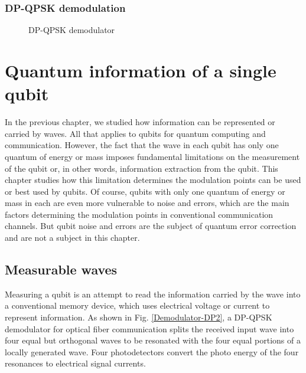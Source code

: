 \documentclass[oneside, letter, 12pt]{book}
\begin{document}
\subsection{DP-QPSK demodulation}
\begin{figure}\label{Demodulator-DP-QPSK}
    \caption{DP-QPSK demodulator}
\end{figure}

\chapter{Quantum information of a single qubit}\label{c-qinfo}
In the previous chapter, we studied how information can be represented or carried by waves. All that applies to qubits for quantum computing and communication. However, the fact that the wave in each qubit has only one quantum of energy or mass imposes fundamental limitations on the measurement of the qubit or, in other words, information extraction from the qubit. This chapter studies how this limitation determines the modulation points can be used or best used by qubits. Of course, qubits with only one quantum of energy or mass in each are even more vulnerable to noise and errors, which are the main factors determining the modulation points in conventional communication channels. But qubit noise and errors are the subject of quantum error correction and are not a subject in this chapter.

\section{Measurable waves}
Measuring a qubit is an attempt to read the information carried by the wave into a conventional memory device, which uses electrical voltage or current to represent information. As shown in Fig. \ref{Demodulator-DP2}, a DP-QPSK demodulator for optical fiber communication splits the received input wave into four equal but orthogonal waves to be resonated with the four equal portions of a locally generated wave. Four photodetectors convert the photo energy of the four resonances to electrical signal currents.
\end{document}
